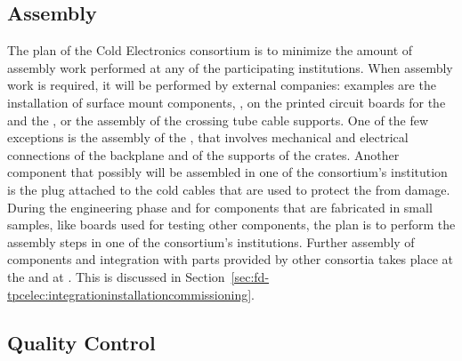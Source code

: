 \subsection{Assembly}
\label{sec:fdsp-tpcelec-production-assembly}

The plan of the Cold Electronics consortium is to minimize
the amount of assembly work performed at any of the participating
institutions. When assembly work is required, it will be performed
by external companies: examples are the installation of surface 
mount components, ,  on the printed 
circuit boards for the  and the , or
the assembly of the crossing tube cable supports. One of the few
exceptions is the assembly of the , that involves
mechanical and electrical connections of the backplane and of
the supports of the crates. Another component that possibly 
will be assembled in one of the consortium's institution is
the plug attached to the cold cables that are used to protect 
the  from  damage. During the engineering
phase and for components that are fabricated in small samples, 
like boards used for testing other components, the plan is to
perform the assembly steps in one of the consortium's institutions.
Further assembly of components and integration with parts
provided by other consortia takes place at the  and
at \surf. This is discussed in 
Section~\ref{sec:fd-tpcelec:integrationinstallationcommissioning}.

\subsection{Quality Control}
\label{sec:fdsp-tpcelec-production-qc}

